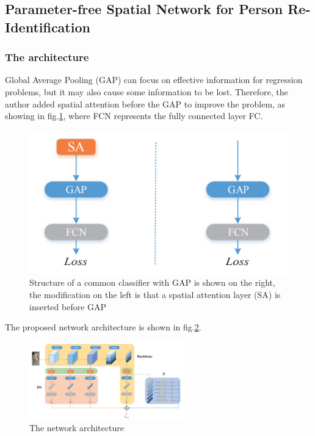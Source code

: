 \subsection{Parameter-free Spatial Network for Person Re-Identification}

\subsubsection{The architecture}
\hspace{0.5cm} Global Average Pooling (GAP) can focus on effective information for regression problems, but it may also cause some information to be lost\cite{SA}. Therefore, the author added spatial attention before the GAP to improve the problem, as showing in fig.\ref{fig:sa_gap}, where FCN represents the fully connected layer FC.\par
 \begin{figure}[h!]
     \centering
     \includegraphics[scale=0.5]{Chapters/Fig/attention-sa-gap.PNG}
     \caption{Structure of a common classifier with GAP is shown on the right, the modification on the left is that a spatial attention layer (SA) is inserted before GAP}
     \label{fig:sa_gap}
 \end{figure}
The proposed network architecture is shown in fig.\ref{fig:sa_arc}.\par
\begin{figure}[h!]
    \centering
    \includegraphics[width=0.6\textwidth]{Chapters/Fig/attention_network.PNG}
    \caption{The network architecture}
    \label{fig:sa_arc}
\end{figure}
